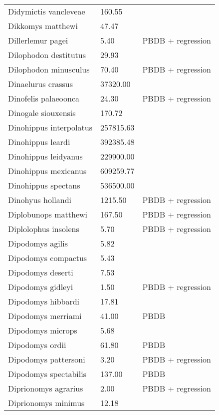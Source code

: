 \begin{longtable}{p{} p{} p{}}
    Didymictis vancleveae & 160.55 & \cite{Scott2004} \\ 
    Dikkomys matthewi & 47.47 & \cite{Tomiya2013} \\ 
    Dillerlemur pagei & 5.40 & PBDB + regression \\ 
    Dilophodon destitutus & 29.93 & \cite{Sinclair1915} \\ 
    Dilophodon minusculus & 70.40 & PBDB + regression \\ 
    Dinaelurus crassus & 37320.00 & \cite{McKenna2011} \\ 
    Dinofelis palaeoonca & 24.30 & PBDB + regression \\ 
    Dinogale siouxensis & 170.72 & \cite{Tomiya2013} \\ 
    Dinohippus interpolatus & 257815.63 & \cite{Tomiya2013} \\ 
    Dinohippus leardi & 392385.48 & \cite{Tomiya2013} \\ 
    Dinohippus leidyanus & 229900.00 & \cite{MacFadden1986} \\ 
    Dinohippus mexicanus & 609259.77 & \cite{Tomiya2013} \\ 
    Dinohippus spectans & 536500.00 & \cite{McKenna2011} \\ 
    Dinohyus hollandi & 1215.50 & PBDB + regression \\ 
    Diplobunops matthewi & 167.50 & PBDB + regression \\ 
    Diplolophus insolens & 5.70 & PBDB + regression \\ 
    Dipodomys agilis & 5.82 & \cite{Smith2004} \\ 
    Dipodomys compactus & 5.43 & \cite{Smith2004} \\ 
    Dipodomys deserti & 7.53 & \cite{Smith2004} \\ 
    Dipodomys gidleyi & 1.50 & PBDB + regression \\ 
    Dipodomys hibbardi & 17.81 & \cite{Tomiya2013} \\ 
    Dipodomys merriami & 41.00 & PBDB \\ 
    Dipodomys microps & 5.68 & \cite{Smith2004} \\ 
    Dipodomys ordii & 61.80 & PBDB \\ 
    Dipodomys pattersoni & 3.20 & PBDB + regression \\ 
    Dipodomys spectabilis & 137.00 & PBDB \\ 
    Diprionomys agrarius & 2.00 & PBDB + regression \\ 
    Diprionomys minimus & 12.18 & \cite{Tomiya2013} \\ 

\end{longtable}
